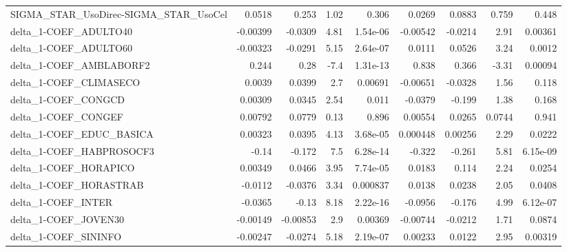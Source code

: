 \begin{tabular}{lrrrrrrrr}
SIGMA\_STAR\_UsoDirec-SIGMA\_STAR\_UsoCel  &      0.0518 &        0.253 &     1.02 &    0.306 &     0.0269 &      0.0883 &        0.759 &         0.448 \\
delta\_1-COEF\_ADULTO40                  &    -0.00399 &      -0.0309 &     4.81 & 1.54e-06 &   -0.00542 &     -0.0214 &         2.91 &       0.00361 \\
delta\_1-COEF\_ADULTO60                  &    -0.00323 &      -0.0291 &     5.15 & 2.64e-07 &     0.0111 &      0.0526 &         3.24 &        0.0012 \\
delta\_1-COEF\_AMBLABORF2                &       0.244 &         0.28 &     -7.4 & 1.31e-13 &      0.838 &       0.366 &        -3.31 &       0.00094 \\
delta\_1-COEF\_CLIMASECO                 &      0.0039 &       0.0399 &      2.7 &  0.00691 &   -0.00651 &     -0.0328 &         1.56 &         0.118 \\
delta\_1-COEF\_CONGCD                    &     0.00309 &       0.0345 &     2.54 &    0.011 &    -0.0379 &      -0.199 &         1.38 &         0.168 \\
delta\_1-COEF\_CONGEF                    &     0.00792 &       0.0779 &     0.13 &    0.896 &    0.00554 &      0.0265 &       0.0744 &         0.941 \\
delta\_1-COEF\_EDUC\_BASICA               &     0.00323 &       0.0395 &     4.13 & 3.68e-05 &   0.000448 &     0.00256 &         2.29 &        0.0222 \\
delta\_1-COEF\_HABPROSOCF3               &       -0.14 &       -0.172 &      7.5 & 6.28e-14 &     -0.322 &      -0.261 &         5.81 &      6.15e-09 \\
delta\_1-COEF\_HORAPICO                  &     0.00349 &       0.0466 &     3.95 & 7.74e-05 &     0.0183 &       0.114 &         2.24 &        0.0254 \\
delta\_1-COEF\_HORASTRAB                 &     -0.0112 &      -0.0376 &     3.34 & 0.000837 &     0.0138 &      0.0238 &         2.05 &        0.0408 \\
delta\_1-COEF\_INTER                     &     -0.0365 &        -0.13 &     8.18 & 2.22e-16 &    -0.0956 &      -0.176 &         4.99 &      6.12e-07 \\
delta\_1-COEF\_JOVEN30                   &    -0.00149 &     -0.00853 &      2.9 &  0.00369 &   -0.00744 &     -0.0212 &         1.71 &        0.0874 \\
delta\_1-COEF\_SININFO                   &    -0.00247 &      -0.0274 &     5.18 & 2.19e-07 &    0.00233 &      0.0122 &         2.95 &       0.00319 \\

\end{tabular}
